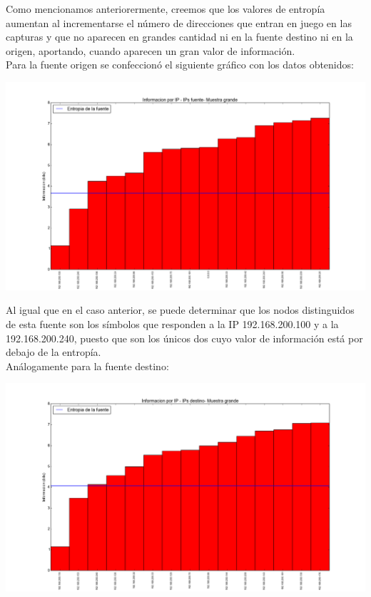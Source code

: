 \indent Como mencionamos anteriorermente, creemos que los valores de entropía aumentan al incrementarse el número de direcciones que entran en juego en las capturas y que no aparecen en grandes cantidad ni en la fuente destino ni en la origen, aportando, cuando aparecen un gran valor de información.\\

\indent Para la fuente origen se confeccionó el siguiente gráfico con los datos obtenidos:\\

\begin{center}
\includegraphics[scale=0.5,clip=true,trim=100 0 0 0]{graphics/laburo_grande_src.png}
\end{center}

\indent Al igual que en el caso anterior, se puede determinar que los nodos distinguidos de esta fuente son los símbolos que responden a la IP 192.168.200.100 y a la 192.168.200.240, puesto que son los únicos dos cuyo valor de información está por debajo de la entropía.\\

\indent Análogamente para la fuente destino:\\

\begin{center}
\includegraphics[scale=0.5,clip=true,trim=100 0 0 0]{graphics/laburo_grande_dst.png}
\end{center}

